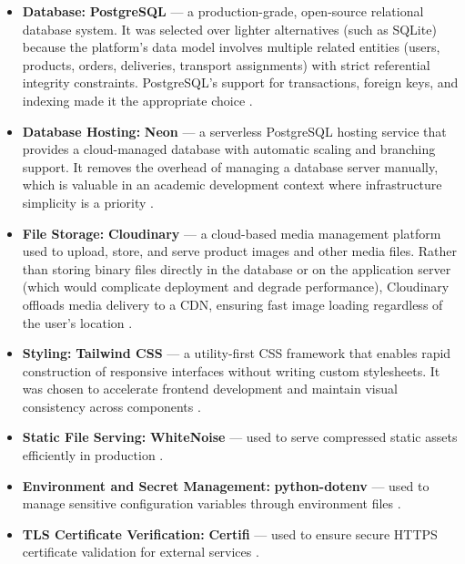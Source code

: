 \begin{itemize}
	\item \textbf{Database:} \textbf{PostgreSQL} — a production-grade, open-source relational database system. It was selected over lighter alternatives (such as SQLite) because the platform's data model involves multiple related entities (users, products, orders, deliveries, transport assignments) with strict referential integrity constraints. PostgreSQL's support for transactions, foreign keys, and indexing made it the appropriate choice \cite{PostgreSQLGroup2024}.
	
	\item \textbf{Database Hosting:} \textbf{Neon} — a serverless PostgreSQL hosting service that provides a cloud-managed database with automatic scaling and branching support. It removes the overhead of managing a database server manually, which is valuable in an academic development context where infrastructure simplicity is a priority \cite{NeonTech2024}.
	
	\item \textbf{File Storage:} \textbf{Cloudinary} — a cloud-based media management platform used to upload, store, and serve product images and other media files. Rather than storing binary files directly in the database or on the application server (which would complicate deployment and degrade performance), Cloudinary offloads media delivery to a CDN, ensuring fast image loading regardless of the user's location \cite{Cloudinary2024}.
	
	\item \textbf{Styling:} \textbf{Tailwind CSS} — a utility-first CSS framework that enables rapid construction of responsive interfaces without writing custom stylesheets. It was chosen to accelerate frontend development and maintain visual consistency across components \cite{TailwindLabs2024}.
	
	\item \textbf{Static File Serving:} \textbf{WhiteNoise} — used to serve compressed static assets efficiently in production \cite{WhiteNoise2024}.
	
	\item \textbf{Environment and Secret Management:} \textbf{python-dotenv} — used to manage sensitive configuration variables through environment files \cite{Wiggins2012TwelveFactor,PythonDotenv2024}.
	
	\item \textbf{TLS Certificate Verification:} \textbf{Certifi} — used to ensure secure HTTPS certificate validation for external services \cite{Certifi2024}.
	

\end{itemize}
